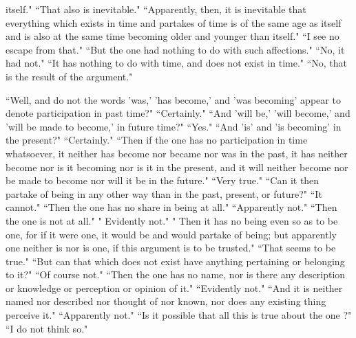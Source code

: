 \documentclass[letterpaper,12pt]{article}
\newcommand{\stephpag}[1]{\marginnote{\small\itshape\fontfamily{ppl}\selectfont #1}}
\begin{document}
itself." ``That also is inevitable." ``Apparently, then, it is inevitable that everything which exists in time and partakes of time \stephpag{d} is of the same age as itself and is also at the same time becoming older and younger than itself." ``I see no escape from that." ``But the one had nothing to do with such affections." ``No, it had not." ``It has nothing to do with time, and does not exist in time." ``No, that is the result of the argument."

``Well, and do not the words 'was,' 'has become,' and 'was becoming' appear to denote participation in past time?" ``Certainly." \stephpag{e} ``And 'will be,' 'will become,' and 'will be made to become,' in future time?" ``Yes." ``And 'is' and 'is becoming' in the present?" ``Certainly." ``Then if the one has no participation in time whatsoever, it neither has become nor became nor was in the past, it has neither become nor is it becoming nor is it in the present, and it will neither become nor be made to become nor will it be in the future." ``Very true." ``Can it then partake of being in any other way than in the past, present, or future?" ``It cannot." ``Then the one has no share in being at all." ``Apparently not." ``Then the one is not at all." " Evidently not." " Then it has no being even so as to be one, for if it were one, it would be and would partake of being; but apparently one neither is nor is one, if this argument is to be trusted." \stephpag{142 a} ``That seems to be true." ``But can that which does not exist have anything pertaining or belonging to it?" ``Of course not." ``Then the one has no name, nor is there any description or knowledge or perception or opinion of it." ``Evidently not." ``And it is neither named nor described nor thought of nor known, nor does any existing thing perceive it." ``Apparently not." ``Is it possible that all this is true about the one ?" ``I do not think so."
\end{document}
